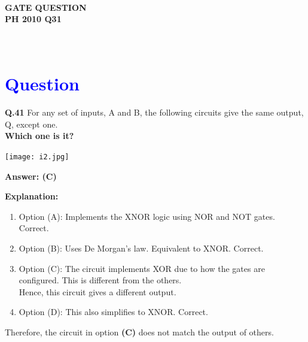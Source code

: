 \documentclass[a4paper,12pt]{article}
\begin{document}
\pagestyle{empty} %

\thispagestyle{fancy} %
\fancyhf{} %
\renewcommand{\headrulewidth}{0pt} %


\vspace{1cm}
\begin{center}

    {\LARGE \textbf{\textcolor{darkskyblue}{\\  GATE QUESTION \\ PH 2010 Q31}}}
\end{center}

\vspace{-1cm} %
\section*{\textcolor{blue}{\\Question}}

\noindent\textbf{Q.41} For any set of inputs, A and B, the following circuits give the same output, Q, except one.\\
\textbf{Which one is it?}

\vspace{1em}

\begin{center}
    \texttt{[image: i2.jpg]} %

\end{center}

\vspace{1em}

\noindent\textbf{Answer: (C)}

\vspace{1em}

\noindent\textbf{Explanation:}

\begin{enumerate}
    \item Option (A): Implements the XNOR logic using NOR and NOT gates. Correct.
    \item Option (B): Uses De Morgan's law. Equivalent to XNOR. Correct.
    \item Option (C): The circuit implements XOR due to how the gates are configured. This is different from the others.\\
    Hence, this circuit gives a different output.
    \item Option (D): This also simplifies to XNOR. Correct.
\end{enumerate}

\noindent Therefore, the circuit in option \textbf{(C)} does not match the output of others.
\end{document}
